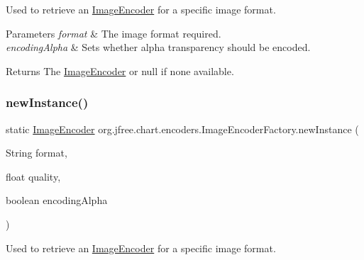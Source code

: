Used to retrieve an \mbox{\hyperlink{interfaceorg_1_1jfree_1_1chart_1_1encoders_1_1_image_encoder}{Image\+Encoder}} for a specific image format.


\begin{DoxyParams}{Parameters}
{\em format} & The image format required. \\
\hline
{\em encoding\+Alpha} & Sets whether alpha transparency should be encoded.\\
\hline
\end{DoxyParams}
\begin{DoxyReturn}{Returns}
The \mbox{\hyperlink{interfaceorg_1_1jfree_1_1chart_1_1encoders_1_1_image_encoder}{Image\+Encoder}} or {\ttfamily null} if none available. 
\end{DoxyReturn}
\mbox{\label{classorg_1_1jfree_1_1chart_1_1encoders_1_1_image_encoder_factory_a74b8d8abeb695ae0a80d2051650274f5}} 
\subsubsection{\texorpdfstring{new\+Instance()}{newInstance()}\hspace{0.1cm}{\footnotesize\ttfamily [4/4]}}
{\footnotesize\ttfamily static \mbox{\hyperlink{interfaceorg_1_1jfree_1_1chart_1_1encoders_1_1_image_encoder}{Image\+Encoder}} org.\+jfree.\+chart.\+encoders.\+Image\+Encoder\+Factory.\+new\+Instance (\begin{DoxyParamCaption}\item[{String}]{format,  }\item[{float}]{quality,  }\item[{boolean}]{encoding\+Alpha }\end{DoxyParamCaption})\hspace{0.3cm}{\ttfamily [static]}}

Used to retrieve an \mbox{\hyperlink{interfaceorg_1_1jfree_1_1chart_1_1encoders_1_1_image_encoder}{Image\+Encoder}} for a specific image format.


